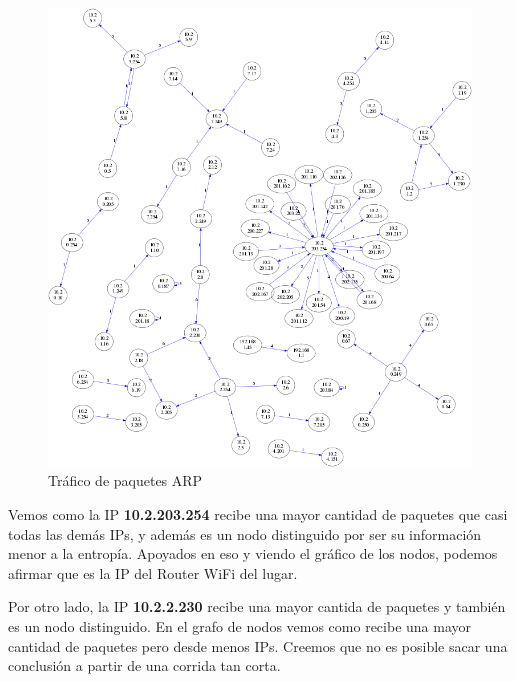 \begin{figure}[H]
       \centering
       \includegraphics[width=1\textwidth]{../resultados/labo-corrida3/network.png}
       \caption{Tráfico de paquetes ARP}
       \label{red-Starbucks-dst-information}
\end{figure}

Vemos como la IP \textbf{10.2.203.254} recibe una mayor cantidad de paquetes que casi todas las demás IPs, y además es un nodo distinguido por ser su información menor a la entropía. Apoyados en eso y viendo el gráfico de los nodos, podemos afirmar que es la IP del Router WiFi del lugar.

Por otro lado, la IP \textbf{10.2.2.230} recibe una mayor cantida de paquetes y  también es un nodo distinguido. En el grafo de nodos vemos como recibe una mayor cantidad de paquetes pero desde menos IPs. Creemos que no es posible sacar una conclusión a partir de una corrida tan corta.